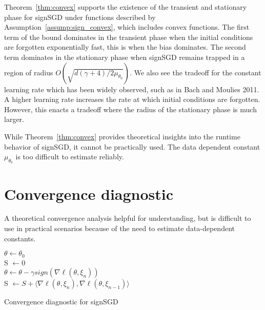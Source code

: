 \documentclass[12pt]{article}
\begin{document}
Theorem~\ref{thm:convex} supports the existence of the transient and stationary phase for signSGD under functions described by Assumption~\ref{assump:sign_convex}, which includes convex functions.
The first term of the bound dominates in the transient phase when the initial conditions are forgotten exponentially fast, this is when the bias dominates.
The second term dominates in the stationary phase when signSGD remains trapped in a region of radius $O( \sqrt{d (\gamma+4) / 2 \mu_{\theta_0}} )$.
We also see the tradeoff for the constant learning rate which has been widely observed, such as in Bach and Moulies 2011.
A higher learning rate increases the rate at which initial conditions are forgotten.
However, this enacts a tradeoff where the radius of the stationary phase is much larger.

While Theorem~\ref{thm:convex} provides theoretical insights into the runtime behavior of signSGD, it cannot be practically used.
The data dependent constant $\mu_{\theta_0}$ is too difficult to estimate reliably.


\section{Convergence diagnostic}
A theoretical convergence analysis helpful for understanding, but is difficult to use in practical scenarios because of the need to estimate data-dependent constants.

\begin{algorithm}[t]
$\theta \gets \theta_0$ \\
S $\gets 0$ \\
 {
 {
$\theta \gets \theta - \gamma sign( \nabla \ell ( \theta, \xi_{n} ) )$ \\
 {
S $\gets S +  \langle  \nabla \ell ( \theta, \xi_{n} ),  \nabla \ell ( \theta, \xi_{n-1} ) \rangle$ \\
 {
\Return{$\theta$}
}
}
}
}
\caption{Convergence diagnostic for signSGD}
\label{alg:diagnostic}
\end{algorithm}
\end{document}
